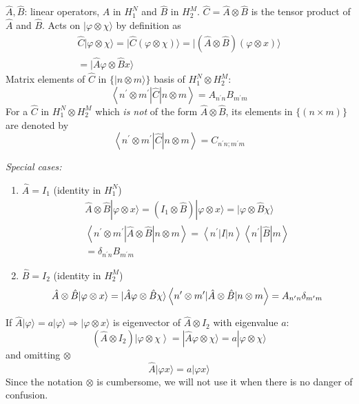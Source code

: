 \documentclass[12pt]{article}
\newcommand{\be}{\begin{equation}}
\newcommand{\ee}{\end{equation}}
\begin{document}
$\hat{A},\hat{B}$: linear operators, $\hat{A}$ in $H_1^N$ and $\hat{B}$ in $H_2^M$. 
$\hat{C} = \hat{A} \otimes \hat{B}$ is the tensor product of $\hat{A}$ and $\hat{B}$.
Acts on $|\varphi \otimes \chi\rangle$ by definition as
\be
\begin{gathered}
\hat{C}|\varphi \otimes \chi\rangle=
|\hat{C}(\varphi \otimes \chi)\rangle=
|(\hat{A} \otimes \hat{B})(\varphi \otimes x)\rangle\\
=|\hat{A} \varphi \otimes \hat{B} x\rangle
\end{gathered}
\ee
Matrix elements of $\hat{C}$ in $\{|n \otimes m\rangle\}$ basis of $H_{1}^{N} \otimes H_{2}^{M}$:
\be
\left\langle n^{\prime} \otimes m^{\prime}|\hat{C}| n \otimes m\right\rangle=A_{n^{\prime}n} B_{m^{\prime}m}
\ee
\setcounter{equation}{11}
For a $\hat{C}$ in $H_{1}^{N} \otimes H_{2}^{M}$ which \emph{is not} of the form $\hat{A}\otimes\hat{B}$,
its elements in $\{(n \times m)\}$ are denoted by
\be
\left\langle n^{\prime} \otimes m^{\prime}|\hat{C}| n \otimes m\right\rangle=C_
{n^{\prime}n;m^{\prime}m}
\ee

\emph{Special cases:} 
\begin{enumerate}
\item $\hat{A} = I_1$ (identity in $H_{1}^{N}$)
\be
\begin{gathered}
\hat{A} \otimes \hat{B}|\varphi \otimes x\rangle = \left(I_{1} \otimes \hat{B}\right)|\varphi \otimes x\rangle = |\varphi \otimes \hat{B} \chi\rangle \\ 
\left\langle n^{\prime} \otimes m^{\prime}|\hat{A} \otimes \hat{B}| n \otimes m\right\rangle=\left\langle n^{\prime}|I| n\right\rangle\left\langle n^{\prime}|\hat{B}| m\right\rangle\\
= \delta_{n^{\prime}n} B_{m^{\prime}m}
\end{gathered}
\ee
\item $\hat{B} = I_2$ (identity in $H_{2}^{M}$)
\be
\hat{A} \otimes \hat{B}|\varphi \otimes x\rangle = |\hat{A} \varphi \otimes \hat{B} \chi\rangle\\
\left\langle n^{\prime} \otimes m^{\prime}|\hat{A} \otimes \hat{B}| n \otimes m\right\rangle = 
A_{n^{\prime}n} \delta_{m^{\prime}m}
\ee 
\end{enumerate}

If $\hat{A}|\varphi\rangle=a|\varphi\rangle \Rightarrow|\varphi \otimes x\rangle$ is eigenvector
of $\hat{A}\otimes I_2$ with eigenvalue $a$:
\be
\left(\hat{A} \otimes I_{2}\right)\left|\varphi \otimes \chi\right\rangle=|\hat{A} \varphi \otimes \chi\rangle=a|\varphi \otimes \chi\rangle
\ee
and omitting $\otimes$
\be
\hat{A}|\varphi x\rangle=a|\varphi x\rangle
\ee
Since the notation $\otimes$ is cumbersome, we will
not use it when there is no danger of
confusion.
\end{document}
